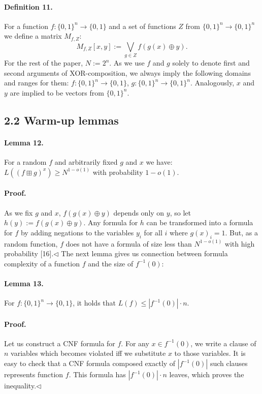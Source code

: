 \paragraph{Definition 11.} For a function $f:\{0,1\}^n\to\{0,1\}$ and a set of functions $Z$ from $\{0,1\}^n\to\{0,1\}^n$ we define a matrix $M_{f,Z}$:
\[M_{f,Z}[x,y]:=\bigvee_{g\in Z}f(g(x)\oplus y).\]
For the rest of the paper, $N:=2^n$.
As we use $f$ and $g$ solely to denote first and second arguments of XOR-composition, we always imply the following domains and ranges for them: $f:\{0,1\}^n\to\{0,1\}$, $g:\{0,1\}^n\to\{0,1\}^n$. Analogously, $x$ and $y$ are implied to be vectors from $\{0,1\}^n$.
\subsection*{2.2 Warm-up lemmas}
\paragraph{Lemma 12.} For a random $f$ and arbitrarily fixed $g$ and $x$ we have: $L((f\boxplus g)^x)\geq N^{1-o(1)}$ with probability $1-o(1)$.
\paragraph{Proof.} As we fix $g$ and $x$, $f(g(x)\oplus y)$ depends only on $y$, so let $h(y):=f(g(x)\oplus y)$.
Any formula for $h$ can be transformed into a formula for $f$ by adding negations to the variables $y_i$ for all $i$ where $g(x)_i=1$. But, as a random function, $f$ does not have a formula of size less than $N^{1-o(1)}$ with high probability [16].\hfill$\triangleleft$
The next lemma gives us connection between formula complexity of a function $f$ and the size of $f^{-1}(0)$:
\paragraph{Lemma 13.} For $f:\{0,1\}^n\to\{0,1\}$, it holds that $L(f)\leq|f^{-1}(0)|\cdot n$.
\paragraph{Proof.} Let us construct a CNF formula for $f$. For any $x\in f^{-1}(0)$, we write a clause of $n$ variables which becomes violated iff we substitute $x$ to those variables. It is easy to check that a CNF formula composed exactly of $|f^{-1}(0)|$ such clauses represents function $f$. This formula has $|f^{-1}(0)|\cdot n$ leaves, which proves the inequality.\hfill$\triangleleft$
